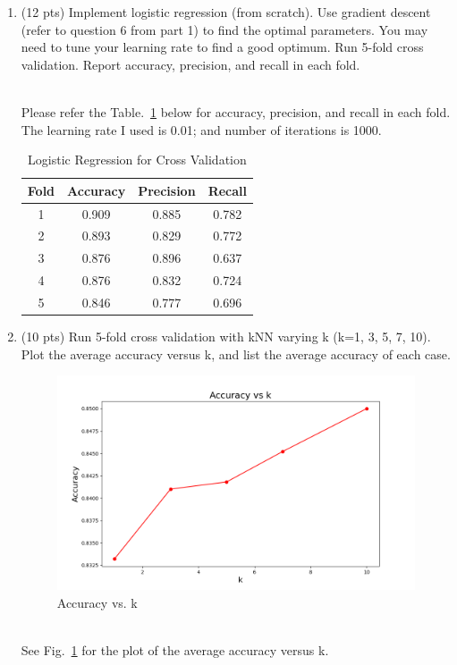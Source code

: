 \documentclass[a4paper]{article}
\theoremstyle{definition}
\newenvironment{soln}{
    \leavevmode\color{blue}\ignorespaces
}{}
\begin{document}
\begin{enumerate}
	\item (12 pts) Implement logistic regression (from scratch). Use gradient descent (refer to question 6 from part 1) to find the optimal parameters. You may need to tune your learning rate to find a good optimum. Run 5-fold cross validation. Report accuracy, precision, and recall in each fold.
	
	\begin{soln}\\
	Please refer the Table.~\ref{tab:lr} below for accuracy, precision, and recall in each fold. The learning rate I used is 0.01; and number of iterations is 1000.
	\begin{table}
		\centering
		\begin{tabular}{|c|c|c|c|}
			\hline
			Fold & Accuracy & Precision & Recall\\
			\hline
			1 & 0.909 & 0.885 & 0.782\\
			2 & 0.893 & 0.829 & 0.772\\
			3 & 0.876 & 0.896 & 0.637\\
			4 & 0.876 & 0.832 & 0.724\\
			5 & 0.846 & 0.777 & 0.696\\
			\hline
		\end{tabular}
		\caption{Logistic Regression for Cross Validation}
		\label{tab:lr}
	\end{table}
	\end{soln}
	
	\item (10 pts) Run 5-fold cross validation with kNN varying k (k=1, 3, 5, 7, 10). Plot the average accuracy versus k, and list the average accuracy of each case. \\
	\begin{figure}
		\centering
		\includegraphics[width=0.5\linewidth]{images/accuracyK.png}
		\caption{Accuracy vs. k} 
		\label{fig:knn}
	\end{figure}
	\begin{soln}\\
	See Fig.~\ref{fig:knn} for the plot of the average accuracy versus k.\\
	\end{soln}
	

\end{enumerate}
\end{document}
